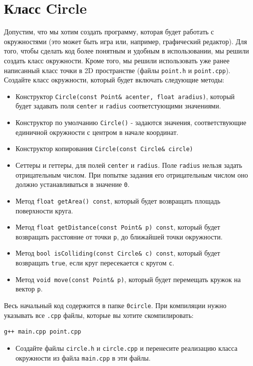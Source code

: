 \documentclass{article}
\begin{document}
\section*{Класс Circle}
Допустим, что мы хотим создать программу, которая будет работать с окружностями (это может быть игра или, например, графический редактор). Для того, чтобы сделать код более понятным и удобным в использовании, мы решили создать класс окружности. Кроме того, мы решили использовать уже ранее написанный класс точки в 2D пространстве (файлы \texttt{point.h} и \texttt{point.cpp}). Создайте класс окружности, который будет включать следующие методы:
\begin{itemize}
\item Конструктор \texttt{Circle(const Point\& acenter, float aradius)}, который будет задавать поля \texttt{center} и \texttt{radius} соответстующими значениями.
\item Конструктор по умолчанию \texttt{Circle()} - задаются значения, соответствующие единичной окружности с центром в начале координат.
\item Конструктор копирования \texttt{Circle(const Circle\& circle)}
\item Сеттеры и геттеры, для полей \texttt{center} и \texttt{radius}. Поле \texttt{radius} нельзя задать отрицательным числом. При попытке задания его отрицательным числом оно должно устанавливаться в значение \texttt{0}.
\item Метод \texttt{float getArea() const}, который будет возвращать площадь поверхности круга.
\item Метод \texttt{float getDistance(const Point\& p) const}, который будет возвращать расстояние от точки \texttt{p}, до ближайшей точки окружности.
\item Метод \texttt{bool isColliding(const Circle\& c) const}, который будет возвращать \texttt{true}, если круг пересекается с кругом \texttt{c}.
\item Метод \texttt{void move(const Point\& p)}, который будет перемещать кружок на вектор \texttt{p}.
\end{itemize}
Весь начальный код содержится в папке \texttt{0circle}. При компиляции нужно указывать все \texttt{.cpp} файлы, которые вы хотите скомпилировать:
\begin{verbatim}
g++ main.cpp point.cpp
\end{verbatim}
\begin{itemize}
\item Создайте файлы \texttt{circle.h} и \texttt{circle.cpp} и перенесите реализацию класса окружности из файла \texttt{main.cpp} в эти файлы.
\end{itemize}
\end{document}
